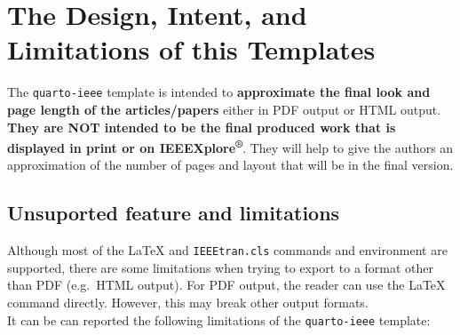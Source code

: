 \documentclass[
  journal,
]{IEEEtran}%
\theoremstyle{plain}
\theoremstyle{remark}
\begin{document}
\hypertarget{the-design-intent-and-limitations-of-this-templates}{%
\section{The Design, Intent, and Limitations of this
Templates}\label{the-design-intent-and-limitations-of-this-templates}}

The \texttt{quarto-ieee} template is intended to \textbf{approximate the
final look and page length of the articles/papers} either in PDF output
or HTML output. \textbf{They are NOT intended to be the final produced
work that is displayed in print or on IEEEXplore\textsuperscript{®}}.
They will help to give the authors an approximation of the number of
pages and layout that will be in the final version.

\hypertarget{unsuported-feature-and-limitations}{%
\subsection{Unsuported feature and
limitations}\label{unsuported-feature-and-limitations}}

Although most of the {\LaTeX} and \texttt{IEEEtran.cls} commands and
environment are supported, there are some limitations when trying to
export to a format other than PDF (e.g.~HTML output). For PDF output,
the reader can use the {\LaTeX} command directly. However, this may
break other output formats.\\
It can be can reported the following limitations of the
\texttt{quarto-ieee} template:
\end{document}
